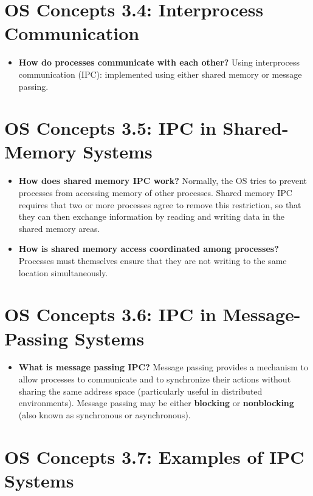 \documentclass[12pt]{article}
\begin{document}
\section*{OS Concepts 3.4: Interprocess Communication}

\begin{itemize}
    \item \textbf{How do processes communicate with each other?} Using interprocess communication (IPC): implemented using either shared memory or message passing.
\end{itemize}

\section*{OS Concepts 3.5: IPC in Shared-Memory Systems}

\begin{itemize}
    \item \textbf{How does shared memory IPC work?} Normally, the OS tries to prevent processes from accessing memory of other processes. Shared memory IPC requires that two or more processes agree to remove this restriction, so that they can then exchange information by reading and writing data in the shared memory areas.
    \item \textbf{How is shared memory access coordinated among processes?} Processes must themselves ensure that they are not writing to the same location simultaneously.
\end{itemize}

\section*{OS Concepts 3.6: IPC in Message-Passing Systems}

\begin{itemize}
    \item \textbf{What is message passing IPC?} Message passing provides a mechanism to allow processes to communicate and to synchronize their actions without sharing the same address space (particularly useful in distributed environments). Message passing may be either \textbf{blocking} or \textbf{nonblocking} (also known as synchronous or asynchronous).
\end{itemize}

\section*{OS Concepts 3.7: Examples of IPC Systems}
\end{document}
